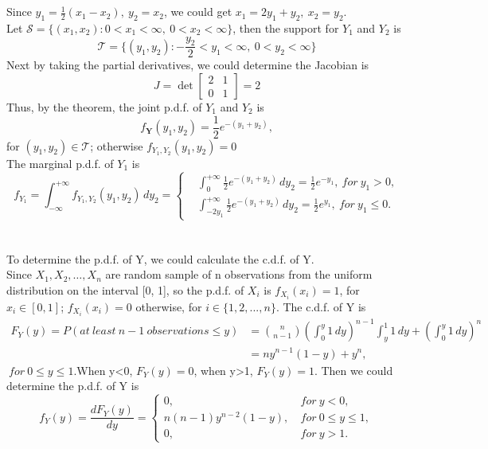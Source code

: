 \documentclass[10.5pt]{article}
\begin{document}
\section{}
Since $y_1=\frac{1}{2}(x_1-x_2),~y_2=x_2$, we could get $x_1=2y_1+y_2,~x_2=y_2$.\\\indent
Let $\mathcal{S} = \{(x_1,x_2):0<x_1<\infty,~0<x_2<\infty\}$, then the support for $Y_1$ and $Y_2$ is $$\mathcal{T} = \{(y_1,y_2):-\frac{y_2}{2}<y_1<\infty,~0<y_2<\infty\}$$\indent
Next by taking the partial derivatives, we could determine the Jacobian is $$J = \det\begin{bmatrix}
    2 & 1\\
    0 & 1
\end{bmatrix} = 2$$\indent
Thus, by the theorem, the joint p.d.f. of $Y_1$ and $Y_2$ is $$f_{\mathbf{Y}}(y_1,y_2) = \frac{1}{2} e^{-(y_1+y_2)},$$\indent
for $(y_1,y_2) \in \mathcal{T}$; otherwise $f_{Y_1,Y_2}(y_1,y_2) = 0$\\\indent
The marginal p.d.f. of $Y_1$ is $$f_{Y_1} = \int_{-\infty}^{+\infty} f_{Y_1,Y_2}(y_1,y_2) \,dy_2 =\begin{cases} 
    & \int_{0}^{+\infty} \frac{1}{2} e^{-(y_1+y_2)} \,dy_2 = \frac{1}{2}e^{-y_1}, ~for ~y_1>0,\\
    & \int_{-2y_1}^{+\infty} \frac{1}{2} e^{-(y_1+y_2)} \,dy_2 = \frac{1}{2}e^{y_1}, ~for ~y_1\leqslant 0.
\end{cases}$$

\section{}
To determine the p.d.f. of Y, we could calculate the c.d.f. of Y.\\\indent
Since $X_1,X_2,\dots,X_n$ are random sample of n observations from the uniform distribution on the interval [0, 1], so the p.d.f. of $X_i$ is $f_{X_i}(x_i) = 1$, for $x_i\in [0,1]$; $f_{X_i}(x_i) = 0$ otherwise, for $i\in\{1,2,...,n\}$. The c.d.f. of Y is $$\begin{aligned}F_Y(y) = P(at ~least ~n-1 ~observations \leqslant y) &= \binom{n}{n-1} \left(\int_0^y 1\,dy\right)^{n-1} \int_y^1 1\,dy + \left(\int_0^y 1\,dy\right)^n\\ &= ny^{n-1}(1-y)+y^n,\end{aligned}$$ $~for ~0\leqslant y\leqslant 1$.When y<0, $F_Y(y) = 0$, when y>1, $F_Y(y) = 1$. Then we could determine the p.d.f. of Y is $$f_Y(y) = \frac{d F_Y(y)}{dy} = \begin{cases}
    0, & ~for ~y<0,\\
    n(n-1)y^{n-2}(1-y), & ~for ~0\leqslant y\leqslant 1,\\
    0, & ~for ~y>1.
\end{cases}$$
\end{document}
